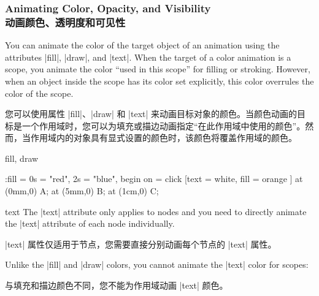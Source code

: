 \subsubsection{Animating Color, Opacity, and Visibility\\动画颜色、透明度和可见性}
\label{section-animation-painting}

You can animate the color of the target object of an animation using the
attributes |fill|, |draw|, and |text|. When the target of a color animation is
a scope, you animate the color ``used in this scope'' for filling or stroking.
However, when an object inside the scope has its color set explicitly, this
color overrules the color of the scope.

您可以使用属性 |fill|、|draw| 和 |text| 来动画目标对象的颜色。当颜色动画的目标是一个作用域时，您可以为填充或描边动画指定“在此作用域中使用的颜色”。然而，当作用域内的对象具有显式设置的颜色时，该颜色将覆盖作用域的颜色。

\begin{tikzanimateattribute}{fill, draw}
\begin{codeexample}[
    preamble={\usetikzlibrary{animations}},
    animation list={0.5,1,1.5,2},
]
\tikz :fill = {0s = "red", 2s = "blue", begin on = click}
      [text = white, fill = orange ] {
  \node [fill]                   at (0mm,0) {A};
  \node [fill]                   at (5mm,0) {B};
  \node [fill = green!50!black ] at (1cm,0) {C};
}
\end{codeexample}
\end{tikzanimateattribute}

\begin{tikzanimateattribute}{text}
    The |text| attribute only applies to nodes and you need to directly animate
    the |text| attribute of each node individually.
    
    |text| 属性仅适用于节点，您需要直接分别动画每个节点的 |text| 属性。


\begin{codeexample}[
    preamble={\usetikzlibrary{animations}},
    animation list={0.5,1,1.5,2},
]
\end{codeexample}
    Unlike the |fill| and |draw| colors, you cannot animate the |text| color
    for scopes:
    
    与填充和描边颜色不同，您不能为作用域动画 |text| 颜色。


\begin{codeexample}[
    preamble={\usetikzlibrary{animations}},
    animation list={0.5,1,1.5,2},
]
\end{codeexample}
\end{tikzanimateattribute}


